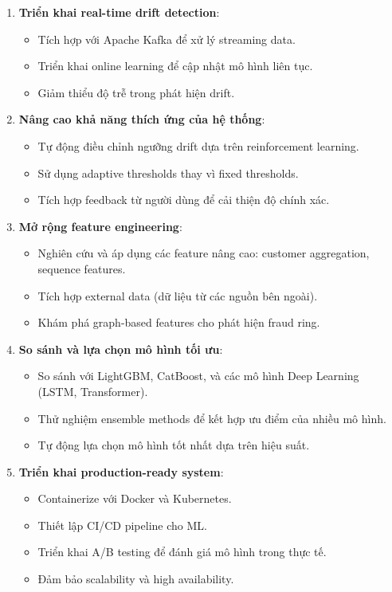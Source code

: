 \begin{enumerate}
    \item \textbf{Triển khai real-time drift detection}:
    \begin{itemize}
        \item Tích hợp với Apache Kafka để xử lý streaming data.
        \item Triển khai online learning để cập nhật mô hình liên tục.
        \item Giảm thiểu độ trễ trong phát hiện drift.
    \end{itemize}
    
    \item \textbf{Nâng cao khả năng thích ứng của hệ thống}:
    \begin{itemize}
        \item Tự động điều chỉnh ngưỡng drift dựa trên reinforcement learning.
        \item Sử dụng adaptive thresholds thay vì fixed thresholds.
        \item Tích hợp feedback từ người dùng để cải thiện độ chính xác.
    \end{itemize}
    
    \item \textbf{Mở rộng feature engineering}:
    \begin{itemize}
        \item Nghiên cứu và áp dụng các feature nâng cao: customer aggregation, sequence features.
        \item Tích hợp external data (dữ liệu từ các nguồn bên ngoài).
        \item Khám phá graph-based features cho phát hiện fraud ring.
    \end{itemize}
    
    \item \textbf{So sánh và lựa chọn mô hình tối ưu}:
    \begin{itemize}
        \item So sánh với LightGBM, CatBoost, và các mô hình Deep Learning (LSTM, Transformer).
        \item Thử nghiệm ensemble methods để kết hợp ưu điểm của nhiều mô hình.
        \item Tự động lựa chọn mô hình tốt nhất dựa trên hiệu suất.
    \end{itemize}
    
    \item \textbf{Triển khai production-ready system}:
    \begin{itemize}
        \item Containerize với Docker và Kubernetes.
        \item Thiết lập CI/CD pipeline cho ML.
        \item Triển khai A/B testing để đánh giá mô hình trong thực tế.
        \item Đảm bảo scalability và high availability.
    \end{itemize}
    

\end{enumerate}
